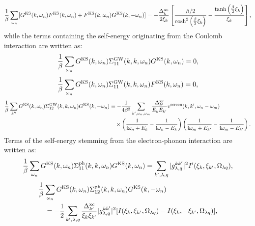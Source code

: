 %
\begin{equation}
	\frac{1}{\beta}\sum_{\omega_n}
	[G^{\rm KS}(k,\omega_n)F^{\rm KS}(k,\omega_n) + F^{\rm KS}(k,\omega_n)G^{\rm KS}(k,-\omega_n)]
	= -\frac{\Delta^{\rm xc}_{k}}{2\xi_{k}} 
	\left[ \frac{\beta/2}{\cosh^2\left( \frac{\beta}{2}\xi_{k} \right)} -
	\frac{\tanh\left( \frac{\beta}{2}\xi_{k} \right)}{\xi_{k}} \right],
	\label{eq:GFFGsum}
\end{equation}
%
while the terms containing the self-energy originating from the Coulomb interaction are written as:
%
\begin{equation}
	\frac{1}{\beta}\sum_{\omega_n} G^{\rm KS}(k,\omega_n)\Sigma^{\rm GW}_{11}(k,k,\omega_n)G^{\rm KS}(k,\omega_n)
	= 0,
	\label{eq:GW11sum1}
\end{equation}
%
\begin{equation}
	\frac{1}{\beta}\sum_{\omega_n} G^{\rm KS}(k,\omega_n)\Sigma^{\rm GW}_{11}(k,k,\omega_n)F^{\rm KS}(k,\omega_n)
	= 0,
	\label{eq:GW11sum2}
\end{equation}
%
\begin{equation}
	\begin{split}
	\frac{1}{\beta}\sum_{k''} G^{\rm KS}(k,\omega_n)\Sigma^{\rm GW}_{12}(k,k,\omega_n)G^{\rm KS}(k,-\omega_n)
	& = -\frac{1}{4\beta^2}\sum_{k',\omega_n,\omega_m}
	\frac{\Delta^{\rm xc}_{k'}}{E_{k}E_{k'}}v^{\rm screen}(k,k',\omega_n - \omega_m) \\
	&\quad \times \left( \frac{1}{ {\rm i}\omega_n + E_{k}} - \frac{1}{ {\rm i}\omega_n - E_{k}} \right)
	\left( \frac{1}{ {\rm i}\omega_m + E_{k'}} - \frac{1}{ {\rm i}\omega_m - E_{k'}} \right).
	\label{eq:GW12sum}
\end{split}
\end{equation}
%
Terms of the self-energy stemming from the electron-phonon interaction are written as:
%
\begin{equation}
	\frac{1}{\beta} \sum_{\omega_n}G^{\rm KS}(k,\omega_n)\Sigma^{\rm ph}_{11}(k,k,\omega_n)G^{\rm KS}(k,\omega_n)
	= \sum_{k',\lambda,q} |g^{kk'}_{\lambda,q}|^2 I'(\xi_k,\xi_{k'},\Omega_{\lambda q}),
	\label{eq:ph11sum1}
\end{equation}
%
\begin{equation}
	\begin{split}
	&\frac{1}{\beta} \sum_{\omega_n}G^{\rm KS}(k,\omega_n)\Sigma^{\rm ph}_{12}(k,k,\omega_n)G^{\rm KS}(k,-\omega_n)\\
	& \quad =
	-\frac{1}{2}\sum_{k',\lambda,q}\frac{\Delta^{\rm xc}_{k'}}{\xi_{k}\xi_{k'}}
	|g^{kk'}_{\lambda,q}|^2 [I(\xi_k,\xi_{k'},\Omega_{\lambda q})-I(\xi_k,-\xi_{k'},\Omega_{\lambda q})],
	\end{split}
	\label{eq:ph12sum}
\end{equation}
